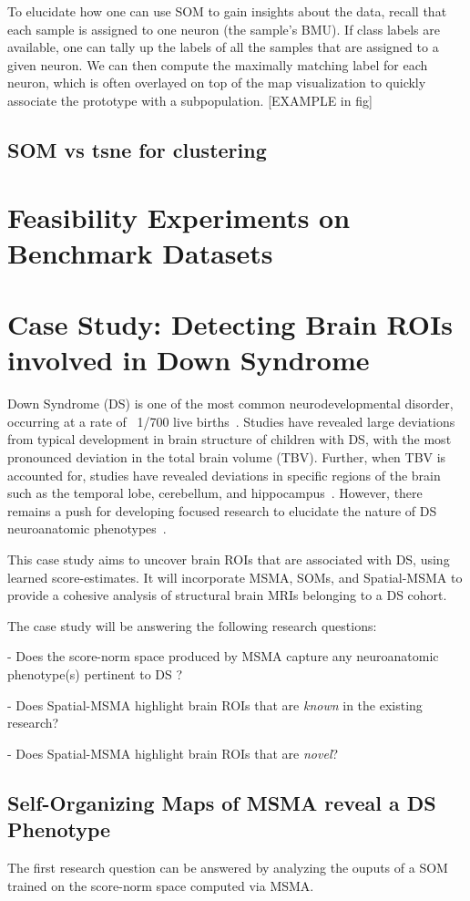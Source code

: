 To elucidate how one can use SOM to gain insights about the data, recall that each sample is assigned to one neuron (the sample's BMU). If class labels are available, one can tally up the labels of all the samples that are assigned to a given neuron. We can then compute the maximally matching label for each neuron, which is often  overlayed on top of the map visualization to quickly associate the prototype with a subpopulation.
[EXAMPLE in fig]

\subsection*{SOM vs tsne for clustering}

\section{Feasibility Experiments on Benchmark Datasets }

\section{Case Study: Detecting Brain ROIs involved in Down Syndrome}

Down Syndrome (DS) is one of the most common neurodevelopmental disorder, occurring at a rate of ~1/700 live births~\cite{parker2010updated}. Studies have revealed large deviations from typical development in brain structure of children with DS, with the most pronounced deviation in the total brain volume (TBV). Further, when TBV is accounted for, studies have revealed deviations in specific regions of the brain such as the temporal lobe, cerebellum, and hippocampus~\cite{hamnerPediatricBrainDevelopment2018}. However, there remains a push for developing focused research to elucidate the nature of DS neuroanatomic phenotypes~\cite{hamnerPediatricBrainDevelopment2018}.

This case study aims to uncover brain ROIs that are associated with DS, using learned score-estimates. It will incorporate MSMA, SOMs, and Spatial-MSMA to provide a cohesive analysis of structural brain MRIs belonging to a DS cohort.

The case study will be answering the following research questions: 

	- Does the score-norm space produced by MSMA capture any neuroanatomic phenotype(s) pertinent to DS ?
 
	- Does Spatial-MSMA highlight brain ROIs that are \textit{known} in the existing research?

	- Does Spatial-MSMA highlight brain ROIs that are \textit{novel}?

\subsection*{Self-Organizing Maps of MSMA reveal a DS Phenotype}
The first research question can be answered by analyzing the ouputs of a SOM trained on the score-norm space computed via MSMA.



